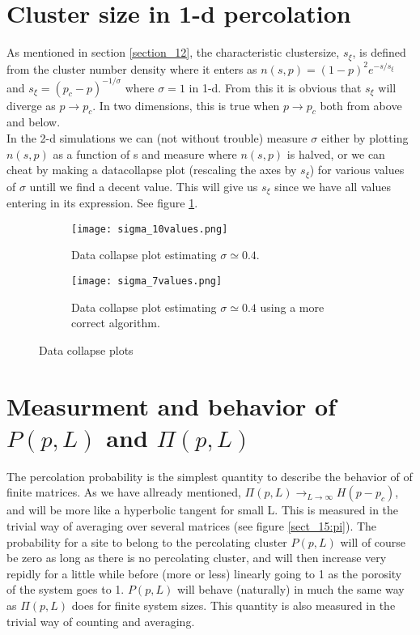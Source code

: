 \documentclass[a4paper,english, 10pt, twoside]{article}
\begin{document}
\section{Cluster size in 1-d percolation}
As mentioned in section \ref{section_12}, the characteristic clustersize, $s_\xi$, is defined from the cluster number density where 
it enters as $n(s,p) = (1-p)^2e^{-s/s_\xi}$ and $s_\xi = (p_c-p)^{-1/\sigma}$ where $\sigma=1$ in 1-d. From this it is obvious that $s_\xi$ 
will diverge as $p\to p_c$. In two dimensions, this is true when $p\to p_c$ both from above and below. \\
In the 2-d simulations we can (not without trouble) measure $\sigma$ either by plotting $n(s,p)$ as a function of s and measure where 
$n(s,p)$ is halved, or we can cheat by making a datacollapse plot (rescaling the axes by $s_\xi$) for various values of $\sigma$ untill 
we find a decent value. This will give us $s_\xi$ since we have all values entering in its expression. See figure \ref{sigma}.
\begin{figure}[H]
\centering
\begin{subfigure}[b]{\textwidth}
\texttt{[image: sigma\_10values.png]}
\caption{Data collapse plot estimating $\sigma \simeq 0.4$.}
\end{subfigure}

\begin{subfigure}[b]{0.9\textwidth}
 \texttt{[image: sigma\_7values.png]}
 \caption{Data collapse plot estimating $\sigma \simeq 0.4$ using a more correct algorithm.}
\end{subfigure}
\caption{Data collapse plots}
\label{sigma}
\end{figure}


\section{Measurment and behavior of $P(p,L)$ and $\Pi(p,L)$}\label{section_15}
The percolation probability is the simplest quantity to describe the behavior of of finite matrices. As we have 
allready mentioned, $\Pi(p,L)\to_{L\to\infty}H(p-p_c)$, and will be more like a hyperbolic tangent for small L. 
This is measured in the trivial way of averaging over several matrices (see figure \ref{sect_15:pi}). The probability 
for a site to belong to the percolating cluster $P(p,L)$ will of course be zero as long as there is no percolating 
cluster, and will then increase very repidly for a little while before (more or less) linearly going to 1 as the 
porosity of the system goes to 1. $P(p,L)$ will behave (naturally) in much the same way as $\Pi(p,L)$ does for finite 
system sizes. This quantity is also measured in the trivial way of counting and averaging.
\end{document}
